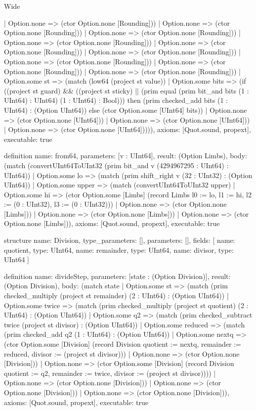 \begin{lexlean}{Wide}
\begin{semanticmodule}
{                        | Option.none => (ctor Option.none [Rounding]))
                      | Option.none => (ctor Option.none [Rounding]))
                    | Option.none => (ctor Option.none [Rounding]))
                  | Option.none => (ctor Option.none [Rounding]))
                | Option.none => (ctor Option.none [Rounding]))
              | Option.none => (ctor Option.none [Rounding]))
            | Option.none => (ctor Option.none [Rounding]))
          | Option.none => (ctor Option.none [Rounding]))
        | Option.none => (ctor Option.none [Rounding]))
      | Option.some st => (match (low64 (project st value))
        | Option.some bits => (if ((project st guard) && ((project st sticky) || (prim equal (prim bit_and bits (1 : UInt64) : UInt64) (1 : UInt64) : Bool))) then (prim checked_add bits (1 : UInt64) : (Option UInt64)) else (ctor Option.some [UInt64] bits))
        | Option.none => (ctor Option.none [UInt64]))
      | Option.none => (ctor Option.none [UInt64]))
    | Option.none => (ctor Option.none [UInt64])))),
  axioms: [Quot.sound, propext],
  executable: true
}

definition{
  name: from64,
  parameters: [v : UInt64],
  result: (Option Limbs),
  body: (match (convertUInt64ToUInt32 (prim bit_and v (4294967295 : UInt64) : UInt64))
    | Option.some lo => (match (prim shift_right v (32 : UInt32) : (Option UInt64))
      | Option.some upper => (match (convertUInt64ToUInt32 upper)
        | Option.some hi => (ctor Option.some [Limbs] (record Limbs {l0 := lo, l1 := hi, l2 := (0 : UInt32), l3 := (0 : UInt32)}))
        | Option.none => (ctor Option.none [Limbs]))
      | Option.none => (ctor Option.none [Limbs]))
    | Option.none => (ctor Option.none [Limbs])),
  axioms: [Quot.sound, propext],
  executable: true
}

structure{
  name: Division,
  type_parameters: [],
  parameters: [],
  fields: [
    {name: quotient, type: UInt64},
    {name: remainder, type: UInt64},
    {name: divisor, type: UInt64}
  ]
}

definition{
  name: divideStep,
  parameters: [state : (Option Division)],
  result: (Option Division),
  body: (match state
    | Option.some st => (match (prim checked_multiply (project st remainder) (2 : UInt64) : (Option UInt64))
      | Option.some twice => (match (prim checked_multiply (project st quotient) (2 : UInt64) : (Option UInt64))
        | Option.some q2 => (match (prim checked_subtract twice (project st divisor) : (Option UInt64))
          | Option.some reduced => (match (prim checked_add q2 (1 : UInt64) : (Option UInt64))
            | Option.some nextq => (ctor Option.some [Division] (record Division {quotient := nextq, remainder := reduced, divisor := (project st divisor)}))
            | Option.none => (ctor Option.none [Division]))
          | Option.none => (ctor Option.some [Division] (record Division {quotient := q2, remainder := twice, divisor := (project st divisor)})))
        | Option.none => (ctor Option.none [Division]))
      | Option.none => (ctor Option.none [Division]))
    | Option.none => (ctor Option.none [Division])),
  axioms: [Quot.sound, propext],
  executable: true
}


\end{semanticmodule}
\end{lexlean}
